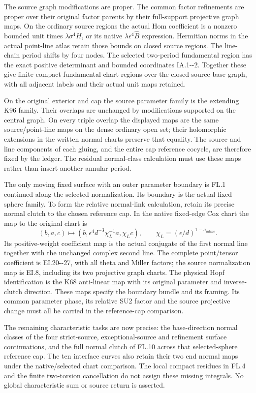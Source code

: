 The source graph modifications are proper. The common
factor refinements are proper over their original
factor parents by their full-support projective graph
maps. On the ordinary source regions the actual Hom
coefficient is a nonzero bounded unit times
\(\lambda\sigma^4H\), or its native
\(\lambda\epsilon^4\widehat B\) expression. Hermitian
norms in the actual point-line atlas retain those
bounds on closed source regions. The line-chain
period shifts by four nodes. The selected two-period
fundamental region has the exact positive determinant
and bounded coordinates IA.1-\/-2. Together these give
finite compact fundamental chart regions over the
closed source-base graph, with all adjacent labels
and their actual unit maps retained.

On the original exterior and cap the source parameter
family is the extending K96 family. Their overlaps
are unchanged by modifications supported on the
central graph. On every triple overlap the displayed
maps are the same source/point-line maps on the dense
ordinary open set; their holomorphic extensions in
the written normal charts preserve that equality.
The source and line components of each gluing, and
the entire cap reference cocycle, are therefore fixed
by the ledger. The residual normal-class calculation
must use these maps rather than insert another
annular period.

The only moving fixed surface with an outer parameter
boundary is FL.1 continued along the selected
normalization. Its boundary is the actual fixed
sphere family. To form the relative normal-link
calculation, retain its precise normal clutch to
the chosen reference cap. In the native fixed-edge
Cox chart the map to the original chart is
\[
 (b,a,c)\longmapsto
 (b,\epsilon^4d^{-3}\chi_L^{-1}a,\chi_Lc),
 \qquad\chi_L=(\epsilon/d)^{1-a_{
m line}}.
\tag{FL.10}
\]
Its positive-weight coefficient map is the actual
conjugate of the first normal line together with
the unchanged complex second line. The complete
point/tensor coefficient is EI.20-\/-27, with all
theta and Miller factors; the source normalization
map is EI.8, including its two projective graph
charts. The physical Hopf identification is the
K68 anti-linear map with its original parameter
and inverse-clutch direction. These maps specify
the boundary bundle and its framing. Its common
parameter phase, its relative SU2 factor and the
source projective change must all be carried in
the reference-cap comparison.

The remaining characteristic tasks are now precise:
the base-direction normal classes of the four
strict-source, exceptional-source and refinement
surface continuations, and the full normal clutch
of FL.10 across that selected-sphere reference cap.
The ten interface curves also retain their two
end normal maps under the native/selected chart
comparison. The local compact residues in FL.4
and the finite two-torsion cancellation do not
assign these missing integrals. No global
characteristic sum or source return is asserted.

